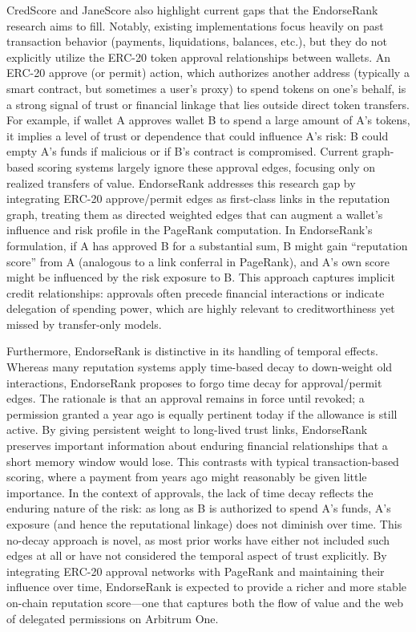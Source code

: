 CredScore and JaneScore also highlight current gaps that the EndorseRank research aims to fill. Notably, existing implementations focus heavily on past transaction behavior (payments, liquidations, balances, etc.), but they do not explicitly utilize the ERC-20 token approval relationships between wallets. An ERC-20 approve (or permit) action, which authorizes another address (typically a smart contract, but sometimes a user's proxy) to spend tokens on one's behalf, is a strong signal of trust or financial linkage that lies outside direct token transfers. For example, if wallet A approves wallet B to spend a large amount of A's tokens, it implies a level of trust or dependence that could influence A's risk: B could empty A's funds if malicious or if B's contract is compromised. Current graph-based scoring systems largely ignore these approval edges, focusing only on realized transfers of value. EndorseRank addresses this research gap by integrating ERC-20 approve/permit edges as first-class links in the reputation graph, treating them as directed weighted edges that can augment a wallet's influence and risk profile in the PageRank computation. In EndorseRank's formulation, if A has approved B for a substantial sum, B might gain ``reputation score'' from A (analogous to a link conferral in PageRank), and A's own score might be influenced by the risk exposure to B. This approach captures implicit credit relationships: approvals often precede financial interactions or indicate delegation of spending power, which are highly relevant to creditworthiness yet missed by transfer-only models.


Furthermore, EndorseRank is distinctive in its handling of temporal effects. Whereas many reputation systems apply time-based decay to down-weight old interactions, EndorseRank proposes to forgo time decay for approval/permit edges. The rationale is that an approval remains in force until revoked; a permission granted a year ago is equally pertinent today if the allowance is still active. By giving persistent weight to long-lived trust links, EndorseRank preserves important information about enduring financial relationships that a short memory window would lose. This contrasts with typical transaction-based scoring, where a payment from years ago might reasonably be given little importance. In the context of approvals, the lack of time decay reflects the enduring nature of the risk: as long as B is authorized to spend A's funds, A's exposure (and hence the reputational linkage) does not diminish over time. This no-decay approach is novel, as most prior works have either not included such edges at all or have not considered the temporal aspect of trust explicitly. By integrating ERC-20 approval networks with PageRank and maintaining their influence over time, EndorseRank is expected to provide a richer and more stable on-chain reputation score---one that captures both the flow of value and the web of delegated permissions on Arbitrum One.


